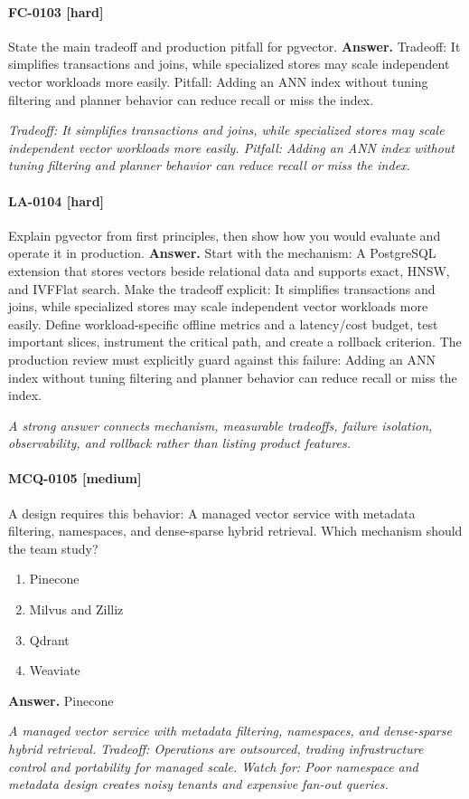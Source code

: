 \paragraph{FC-0103 [hard]} State the main tradeoff and production pitfall for pgvector.
\noindent\textbf{Answer.} Tradeoff: It simplifies transactions and joins, while specialized stores may scale independent vector workloads more easily. Pitfall: Adding an ANN index without tuning filtering and planner behavior can reduce recall or miss the index.
\par\textit{Tradeoff: It simplifies transactions and joins, while specialized stores may scale independent vector workloads more easily. Pitfall: Adding an ANN index without tuning filtering and planner behavior can reduce recall or miss the index.}
\paragraph{LA-0104 [hard]} Explain pgvector from first principles, then show how you would evaluate and operate it in production.
\noindent\textbf{Answer.} Start with the mechanism: A PostgreSQL extension that stores vectors beside relational data and supports exact, HNSW, and IVFFlat search. Make the tradeoff explicit: It simplifies transactions and joins, while specialized stores may scale independent vector workloads more easily. Define workload-specific offline metrics and a latency/cost budget, test important slices, instrument the critical path, and create a rollback criterion. The production review must explicitly guard against this failure: Adding an ANN index without tuning filtering and planner behavior can reduce recall or miss the index.
\par\textit{A strong answer connects mechanism, measurable tradeoffs, failure isolation, observability, and rollback rather than listing product features.}
\paragraph{MCQ-0105 [medium]} A design requires this behavior: A managed vector service with metadata filtering, namespaces, and dense-sparse hybrid retrieval. Which mechanism should the team study?
\begin{enumerate}[label=\Alph*.]
\item Pinecone
\item Milvus and Zilliz
\item Qdrant
\item Weaviate
\end{enumerate}
\noindent\textbf{Answer.} Pinecone
\par\textit{A managed vector service with metadata filtering, namespaces, and dense-sparse hybrid retrieval. Tradeoff: Operations are outsourced, trading infrastructure control and portability for managed scale. Watch for: Poor namespace and metadata design creates noisy tenants and expensive fan-out queries.}
